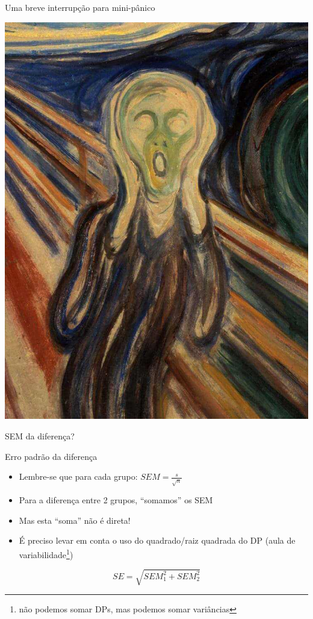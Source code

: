 \documentclass{beamer}
\begin{document}
\begin{frame}{\scriptsize Uma breve interrupção para mini-pânico}
  \begin{center}
    \includegraphics[height=.7\textheight]{Cap7/ogrito}
  \end{center}
  \begin{block}{}
    \begin{center}
      SEM da diferença?
    \end{center}
  \end{block}
\end{frame}

\begin{frame}{\scriptsize Erro padrão da diferença}
  \begin{itemize}
    \footnotesize
  \item Lembre-se que para cada grupo: $SEM = \frac{s}{\sqrt{n}}$
  \item Para a diferença entre 2 grupos, ``somamos'' os SEM
  \item Mas esta ``soma'' não é direta!
  \item É preciso levar em conta o uso do quadrado/raiz quadrada do DP (aula de variabilidade\footnote{não podemos somar DPs, mas podemos somar variâncias})
  \end{itemize}
  \begin{block}{}
      \begin{displaymath}
    SE = \sqrt{SEM_1^2 + SEM_2^2}
  \end{displaymath}
  \end{block}
\end{frame}
\end{document}
